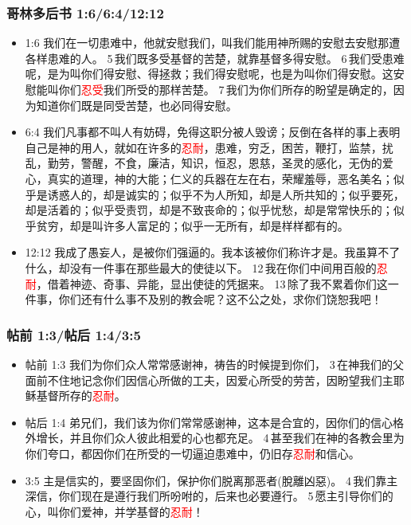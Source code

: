 \subsubsection{哥林多后书 1:6/6:4/12:12} 
\begin{itemize}[noitemsep]
\item 1:6 我们在一切患难中，他就安慰我们，叫我们能用神所赐的安慰去安慰那遭各样患难的人。 5 我们既多受基督的苦楚，就靠基督多得安慰。 6 我们受患难呢，是为叫你们得安慰、得拯救；我们得安慰呢，也是为叫你们得安慰。这安慰能叫你们\textcolor{red}{忍受}我们所受的那样苦楚。 7 我们为你们所存的盼望是确定的，因为知道你们既是同受苦楚，也必同得安慰。
\item 6:4 我们凡事都不叫人有妨碍，免得这职分被人毁谤；反倒在各样的事上表明自己是神的用人，就如在许多的\textcolor{red}{忍耐}，患难，穷乏，困苦，鞭打，监禁，扰乱，勤劳，警醒，不食，廉洁，知识，恒忍，恩慈，圣灵的感化，无伪的爱心，真实的道理，神的大能；仁义的兵器在左在右，荣耀羞辱，恶名美名；似乎是诱惑人的，却是诚实的；似乎不为人所知，却是人所共知的；似乎要死，却是活着的；似乎受责罚，却是不致丧命的；似乎忧愁，却是常常快乐的；似乎贫穷，却是叫许多人富足的；似乎一无所有，却是样样都有的。
\item 12:12 我成了愚妄人，是被你们强逼的。我本该被你们称许才是。我虽算不了什么，却没有一件事在那些最大的使徒以下。 12 我在你们中间用百般的\textcolor{red}{忍耐}，借着神迹、奇事、异能，显出使徒的凭据来。 13 除了我不累着你们这一件事，你们还有什么事不及别的教会呢？这不公之处，求你们饶恕我吧！
\end{itemize}



\subsubsection{帖前 1:3/帖后 1:4/3:5} 
\begin{itemize}[noitemsep]
\item 帖前 1:3 我们为你们众人常常感谢神，祷告的时候提到你们， 3 在神我们的父面前不住地记念你们因信心所做的工夫，因爱心所受的劳苦，因盼望我们主耶稣基督所存的\textcolor{red}{忍耐}。
\item 帖后 1:4 弟兄们，我们该为你们常常感谢神，这本是合宜的，因你们的信心格外增长，并且你们众人彼此相爱的心也都充足。 4 甚至我们在神的各教会里为你们夸口，都因你们在所受的一切逼迫患难中，仍旧存\textcolor{red}{忍耐}和信心。
\item 3:5 主是信实的，要坚固你们，保护你们脱离那恶者(脫離凶惡)。 4 我们靠主深信，你们现在是遵行我们所吩咐的，后来也必要遵行。 5 愿主引导你们的心，叫你们爱神，并学基督的\textcolor{red}{忍耐}！
\end{itemize}

